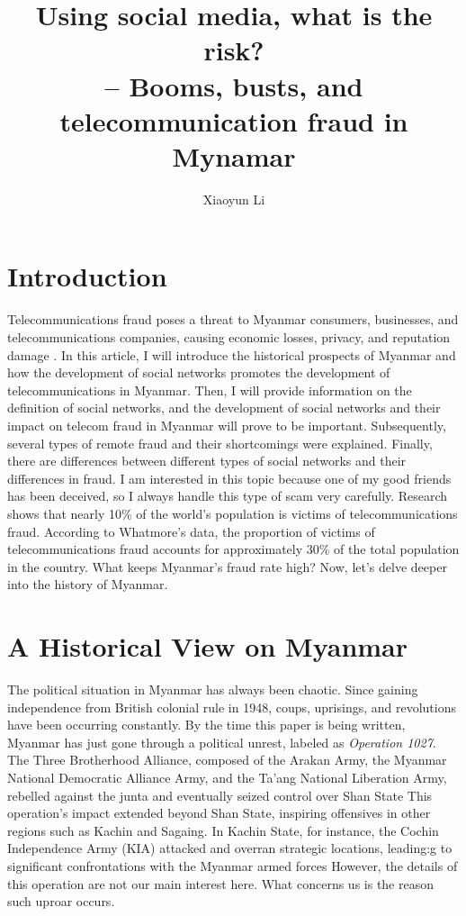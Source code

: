 \documentclass[man,floatsintext]{apa7}
\title{\large{Using social media, what is the risk?} \\
\footnotesize{-- Booms, busts, and telecommunication fraud in Mynamar}}
\author{Xiaoyun Li}
\affiliation{
Centre Number: 94825 \\
Candidate Number: 1002 \\
Unit Number: P301 \\
EPQ June 2024
}
\begin{document}
\maketitle
\tableofcontents
\newpage
\section{Introduction}

Telecommunications fraud poses a threat to Myanmar consumers, businesses, and telecommunications companies, causing economic losses, privacy, and reputation damage \autocite{graboskyTelecommunicationFraudDigital2001}. In this article, I will introduce the historical prospects of Myanmar and how the development of social networks promotes the development of telecommunications in Myanmar. Then, I will provide information on the definition of social networks, and the development of social networks and their impact on telecom fraud in Myanmar will prove to be important. Subsequently, several types of remote fraud and their shortcomings were explained. Finally, there are differences between different types of social networks and their differences in fraud. I am interested in this topic because one of my good friends has been deceived, so I always handle this type of scam very carefully. Research shows that nearly 10\% of the world's population is victims of telecommunications fraud. According to Whatmore's data, the proportion of victims of telecommunications fraud accounts for approximately 30\% of the total population in the country. What keeps Myanmar's fraud rate high? Now, let's delve deeper into the history of Myanmar.

\section{A Historical View on Myanmar}

The political situation in Myanmar has always been chaotic. Since gaining independence from British colonial rule in 1948, coups, uprisings, and revolutions have been occurring constantly. By the time this paper is being written, Myanmar has just gone through a political unrest, labeled as \textit{Operation 1027}. The Three Brotherhood Alliance, composed of the Arakan Army, the Myanmar National Democratic Alliance Army, and the Ta'ang National Liberation Army, rebelled against the junta and eventually seized control over Shan State \autocite{yunsunOperation1027Changing2024} This operation's impact extended beyond Shan State, inspiring offensives in other regions such as Kachin and Sagaing. In Kachin State, for instance, the Cochin Independence Army (KIA) attacked and overran strategic locations, leading:g to significant confrontations with the Myanmar armed forces \autocite{theinternationalinstituteforstrategicstudiesOperation1027Reshapes2023} However, the details of this operation are not our main interest here. What concerns us is the reason such uproar occurs.
\end{document}
